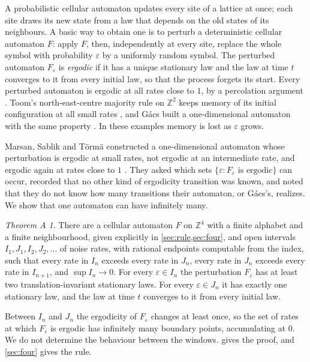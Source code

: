 \documentclass[11pt]{article}
\theoremstyle{plain}
\theoremstyle{definition}
\theoremstyle{remark}
\newtheorem*{mainA}{Theorem A}
\newcommand{\Z}{\mathbb Z}
\newcommand{\eps}{\varepsilon}
\begin{document}
A probabilistic cellular automaton updates every site of a lattice at once; each site draws its new state from a law that depends on the old states of its neighbours. A basic way to obtain one is to perturb a deterministic cellular automaton $F$: apply $F$, then, independently at every site, replace the whole symbol with probability $\eps$ by a uniformly random symbol. The perturbed automaton $F_\eps$ is \emph{ergodic} if it has a unique stationary law and the law at time $t$ converges to it from every initial law, so that the process forgets its start. Every perturbed automaton is ergodic at all rates close to $1$, by a percolation argument \cite{MST19,MST26}. Toom's north-east-centre majority rule on $\Z^2$ keeps memory of its initial configuration at all small rates \cite{Toom80}, and G\'acs built a one-dimensional automaton with the same property \cite{Gacs01}. In these examples memory is lost as $\eps$ grows.

Marsan, Sablik and T\"orm\"a constructed a one-dimensional automaton whose perturbation is ergodic at small rates, not ergodic at an intermediate rate, and ergodic again at rates close to $1$ \cite{MST26}. They asked which sets $\{\eps:F_\eps\text{ is ergodic}\}$ can occur, recorded that no other kind of ergodicity transition was known, and noted that they do not know how many transitions their automaton, or G\'acs's, realizes. We show that one automaton can have infinitely many.

\begin{mainA}
There are a cellular automaton $F$ on $\Z^4$ with a finite alphabet and a finite neighbourhood, given explicitly in \cref{sec:rule,sec:four}, and open intervals $I_1,J_1,I_2,J_2,\dots$ of noise rates, with rational endpoints computable from the index, such that every rate in $I_n$ exceeds every rate in $J_n$, every rate in $J_n$ exceeds every rate in $I_{n+1}$, and $\sup I_n\to0$. For every $\eps\in I_n$ the perturbation $F_\eps$ has at least two translation-invariant stationary laws. For every $\eps\in J_n$ it has exactly one stationary law, and the law at time $t$ converges to it from every initial law.
\end{mainA}

Between $I_n$ and $J_n$ the ergodicity of $F_\eps$ changes at least once, so the set of rates at which $F_\eps$ is ergodic has infinitely many boundary points, accumulating at $0$. We do not determine the behaviour between the windows.  gives the proof, and \cref{sec:four} gives the rule.
\end{document}
